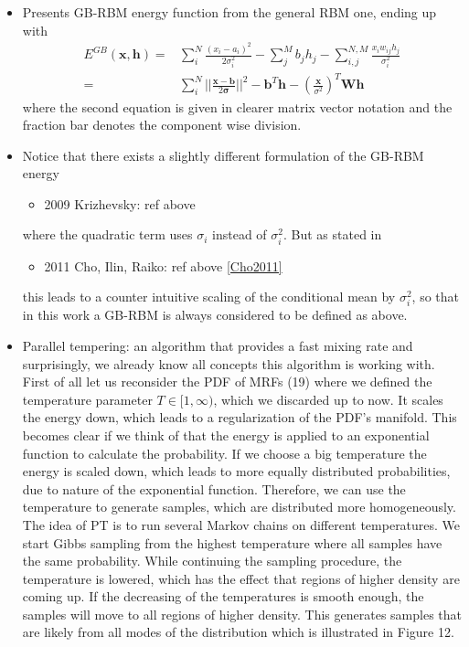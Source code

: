 \documentclass[twoside,english]{uiofysmaster}
\begin{document}
\begin{itemize}
\begin{itemize}
		\item Presents GB-RBM energy function from the general RBM one, ending up with
		\begin{align}
			E^{GB} (\bm{x}, \bm{h}) 
			=& \sum_i^N \frac{(x_i - a_i)^2}{2\sigma_i^2} - \sum_j^M b_j h_j - \sum_{i,j}^{N, M} \frac{x_i w_{ij} h_j}{\sigma_i^2} \\
			=& \sum_i^N ||\frac{\bm{x} - \bm{b}}{2 \bm{\sigma}}||^2 - \bm{b}^T \bm{h} - (\frac{\bm{x}}{\sigma^2})^T \bm{W} \bm{h}
		\end{align}
		where the second equation is given in clearer matrix vector notation and the fraction bar denotes the component wise division.
		\item Notice that there exists a slightly different formulation of the GB-RBM energy
		\begin{itemize}
			\item 2009 Krizhevsky: ref above \cite{Krizhevsky2009}
		\end{itemize}
		where the quadratic term uses $\sigma_i$ instead of $\sigma_i^2$. But as stated in
		\begin{itemize}
			\item 2011 Cho, Ilin, Raiko: ref above \ref{Cho2011}
		\end{itemize}
		this leads to a counter intuitive scaling of the conditional mean by $\sigma_i^2$, so that in this work a GB-RBM is always considered to be defined as above.
		\item Parallel tempering: an algorithm that provides a fast mixing rate and surprisingly, we already know all concepts this algorithm is working with. First of all let us reconsider the PDF of MRFs (19) where we defined the temperature parameter $T \in [1, \infty)$,  which we discarded up to now. It scales the energy down, which leads to a regularization of the PDF’s manifold. This becomes clear if we think of that the energy is applied to an exponential function to calculate the probability. If we choose a big temperature the energy is scaled down, which leads to more equally distributed probabilities, due to nature of the exponential function.
		Therefore, we can use the temperature to generate samples, which are distributed more homogeneously.
		The idea of PT is to run several Markov chains on different temperatures. We start Gibbs sampling from the highest temperature where all samples have the same probability. While continuing the sampling procedure, the temperature is lowered, which has the effect that regions of higher density are coming up. If the decreasing of the temperatures is smooth enough, the samples will move to all regions of higher density. This generates samples that are likely from all modes of the distribution which is illustrated in Figure 12.

\end{itemize}
\end{itemize}
\end{document}
